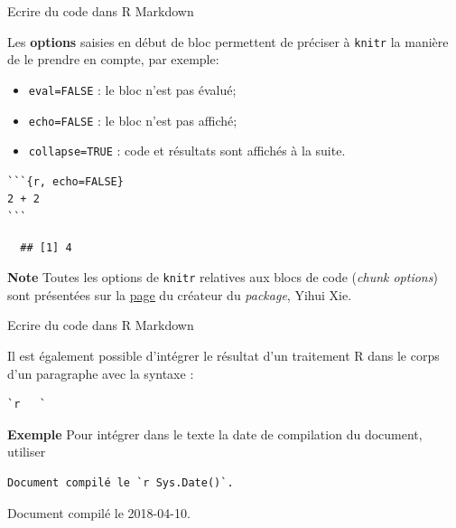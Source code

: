 \documentclass[12pt,ignorenonframetext,]{beamer}
\providecommand{\tightlist}{%
  \setlength{\itemsep}{0pt}\setlength{\parskip}{0pt}}
\newcommand{\intertitre}[1]{\textcolor{redInsee}{\textbf{#1}}}
\begin{document}
\begin{frame}[fragile]{Ecrire du code dans R Markdown}

Les \textbf{options} saisies en début de bloc permettent de préciser à
\texttt{knitr} la manière de le prendre en compte, par exemple:

\begin{itemize}
\tightlist
\item
  \texttt{eval=FALSE} : le bloc n'est pas évalué;
\item
  \texttt{echo=FALSE} : le bloc n'est pas affiché;
\item
  \texttt{collapse=TRUE} : code et résultats sont affichés à la suite.
\end{itemize}

\pause 

\begin{verbatim}
```{r, echo=FALSE}
2 + 2
```
\end{verbatim}

\begin{verbatim}
  ## [1] 4
\end{verbatim}

\pause 

\intertitre{Note} Toutes les options de \texttt{knitr} relatives aux
blocs de code (\emph{chunk options}) sont présentées sur la
\href{http://yihui.name/knitr/options/}{\underline{page}} du créateur du
\emph{package}, Yihui Xie.

\end{frame}

\begin{frame}[fragile]{Ecrire du code dans R Markdown}

Il est également possible d'intégrer le résultat d'un traitement R dans
le corps d'un paragraphe avec la syntaxe :

\begin{verbatim}
`r   `
\end{verbatim}

\pause 

\intertitre{Exemple} Pour intégrer dans le texte la date de compilation
du document, utiliser

\begin{verbatim}
Document compilé le `r Sys.Date()`.
\end{verbatim}

\pause Document compilé le 2018-04-10.

\end{frame}
\end{document}
